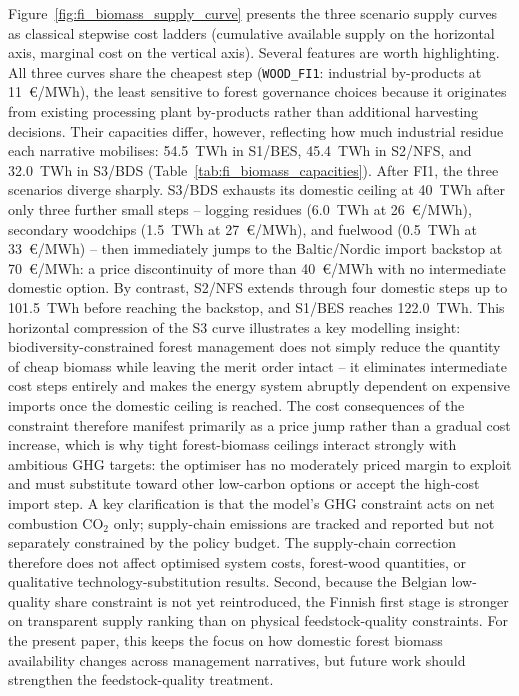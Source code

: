 \documentclass{article}
\begin{document}
Figure~\ref{fig:fi_biomass_supply_curve} presents the three scenario supply curves as classical stepwise cost ladders (cumulative available supply on the horizontal axis, marginal cost on the vertical axis). Several features are worth highlighting. All three curves share the cheapest step (\texttt{WOOD\_FI1}: industrial by-products at 11~€/MWh), the least sensitive to forest governance choices because it originates from existing processing plant by-products rather than additional harvesting decisions. Their capacities differ, however, reflecting how much industrial residue each narrative mobilises: 54.5~TWh in S1/BES, 45.4~TWh in S2/NFS, and 32.0~TWh in S3/BDS (Table~\ref{tab:fi_biomass_capacities}). After FI1, the three scenarios diverge sharply. S3/BDS exhausts its domestic ceiling at 40~TWh after only three further small steps -- logging residues (6.0~TWh at 26~€/MWh), secondary woodchips (1.5~TWh at 27~€/MWh), and fuelwood (0.5~TWh at 33~€/MWh) -- then immediately jumps to the Baltic/Nordic import backstop at 70~€/MWh: a price discontinuity of more than 40~€/MWh with no intermediate domestic option. By contrast, S2/NFS extends through four domestic steps up to 101.5~TWh before reaching the backstop, and S1/BES reaches 122.0~TWh. This horizontal compression of the S3 curve illustrates a key modelling insight: biodiversity-constrained forest management does not simply reduce the quantity of cheap biomass while leaving the merit order intact -- it eliminates intermediate cost steps entirely and makes the energy system abruptly dependent on expensive imports once the domestic ceiling is reached. The cost consequences of the constraint therefore manifest primarily as a price jump rather than a gradual cost increase, which is why tight forest-biomass ceilings interact strongly with ambitious GHG targets: the optimiser has no moderately priced margin to exploit and must substitute toward other low-carbon options or accept the high-cost import step.  A key clarification is that the model's GHG constraint acts on net combustion CO$_2$ only; supply-chain emissions are tracked and reported but not separately constrained by the policy budget. The supply-chain correction therefore does not affect optimised system costs, forest-wood quantities, or qualitative technology-substitution results. Second, because the Belgian low-quality share constraint is not yet reintroduced, the Finnish first stage is stronger on transparent supply ranking than on physical feedstock-quality constraints. For the present paper, this keeps the focus on how domestic forest biomass availability changes across management narratives, but future work should strengthen the feedstock-quality treatment.
\end{document}
